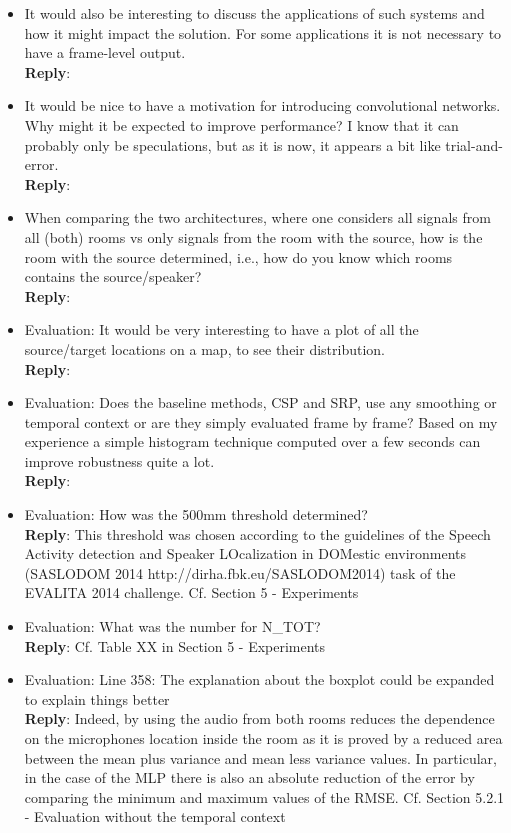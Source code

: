 \documentclass[11pt, technote, letterpaper, oneside, onecolumn]{IEEEtran}
\begin{document}
\begin{itemize}
\item It would also be interesting to discuss the applications of such systems and how it might impact the solution. For some applications it is not necessary to have a frame-level output.\\
\textbf{Reply}:

\item It would be nice to have a motivation for introducing convolutional networks. Why might it be expected to improve performance? I know that it can probably only be speculations, but as it is now, it appears a bit like trial-and-error.\\
\textbf{Reply}:

\item When comparing the two architectures, where one considers all signals from all (both) rooms vs only signals from the room with the source, how is the room with the source determined, i.e., how do you know which rooms contains the source/speaker?\\
\textbf{Reply}:

\item Evaluation: It would be very interesting to have a plot of all the source/target locations on a map, to see their distribution.\\
\textbf{Reply}:

\item Evaluation: Does the baseline methods, CSP and SRP, use any smoothing or temporal context or are they simply evaluated frame by frame? Based on my experience a simple histogram technique computed over a few seconds can improve robustness quite a lot.\\
\textbf{Reply}:

\item Evaluation: How was the 500mm threshold determined?\\
\textbf{Reply}: This threshold was chosen according to the guidelines of the Speech Activity detection and Speaker LOcalization in DOMestic environments (SASLODOM 2014 http://dirha.fbk.eu/SASLODOM2014) task of the EVALITA 2014 challenge. Cf. Section 5 - Experiments

\item Evaluation: What was the number for N\_TOT?\\
\textbf{Reply}: Cf. Table XX in Section 5 - Experiments

\item Evaluation: Line 358: The explanation about the boxplot could be expanded to explain things better\\
\textbf{Reply}: Indeed, by using the audio from both rooms reduces the dependence on the microphones location inside the room as it is proved by a reduced area between the mean plus variance and mean less variance values. In particular, in the case of the MLP there is also an absolute reduction of the error by comparing the minimum and maximum values of the RMSE. Cf. Section 5.2.1 - Evaluation without the temporal context


\end{itemize}
\end{document}
